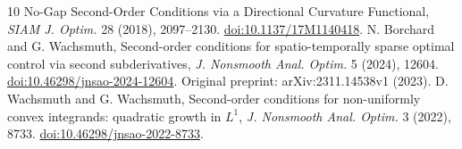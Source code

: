 \documentclass[11pt]{article}
\begin{document}
\begin{thebibliography}{10}
No-Gap Second-Order Conditions via a Directional Curvature Functional,
\emph{SIAM J. Optim.} 28 (2018), 2097--2130.
\href{https://doi.org/10.1137/17M1140418}{doi:10.1137/17M1140418}.
 N. Borchard and G. Wachsmuth,
Second-order conditions for spatio-temporally sparse optimal control via
second subderivatives, \emph{J. Nonsmooth Anal. Optim.} 5 (2024), 12604.
\href{https://doi.org/10.46298/jnsao-2024-12604}{doi:10.46298/jnsao-2024-12604}.
Original preprint: arXiv:2311.14538v1 (2023).
 D. Wachsmuth and G. Wachsmuth,
Second-order conditions for non-uniformly convex integrands: quadratic
growth in $L^1$, \emph{J. Nonsmooth Anal. Optim.} 3 (2022), 8733.
\href{https://doi.org/10.46298/jnsao-2022-8733}{doi:10.46298/jnsao-2022-8733}.
\end{thebibliography}
\end{document}
